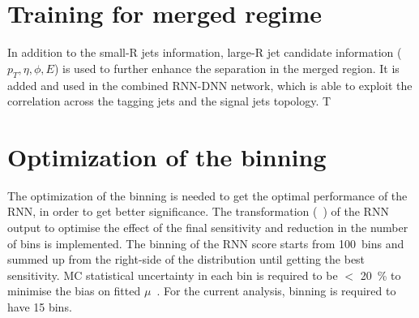 \section{Training for merged regime}
In addition to the small-R jets information, large-R jet candidate information ($p_T, \eta, \phi, E$) is used to further enhance the separation in the merged region. It is added and used in the combined RNN-DNN network, which is able to exploit the correlation across the tagging jets and the signal jets topology.
T%

\section{Optimization of the binning}
The optimization of the binning is needed to get the optimal performance of the RNN, in order to get better significance. The transformation (~\cite{ATL-PHYS-PUB-2019-009}) of the RNN output to optimise the effect of the final sensitivity and reduction in the number of bins is implemented.
The binning of the RNN score starts from 100~bins and summed up from the right-side of the distribution until getting the best sensitivity. 
MC statistical uncertainty in each bin is required to be $<$ 20~\% to minimise the bias on fitted $\mu$~\cite{ATL-PHYS-PUB-2019-009}. For the current analysis, binning is required to have 15 bins.